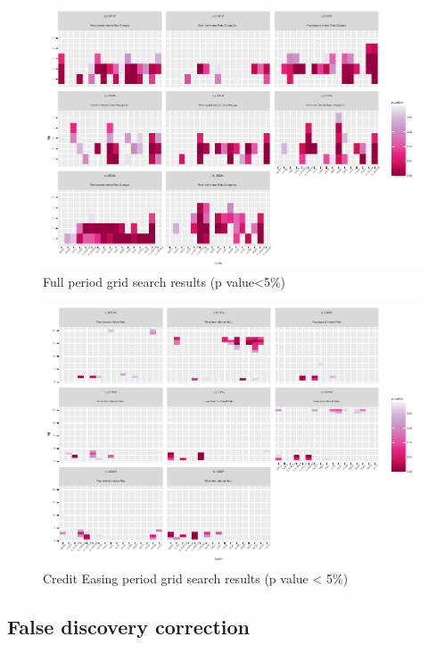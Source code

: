 \documentclass[
]{article}
\begin{document}
\begin{figure}
\centering
\includegraphics{working_paper_files/figure-latex/fullless5-1.pdf}
\caption{Full period grid search results (p value\textless5\%)}
\end{figure}

\begin{figure}
\centering
\includegraphics{working_paper_files/figure-latex/CE1-1.pdf}
\caption{Credit Easing period grid search results (p value \textless{}
5\%)}
\end{figure}

\hypertarget{false-discovery-correction}{%
\subsection{False discovery
correction}\label{false-discovery-correction}}
\end{document}
